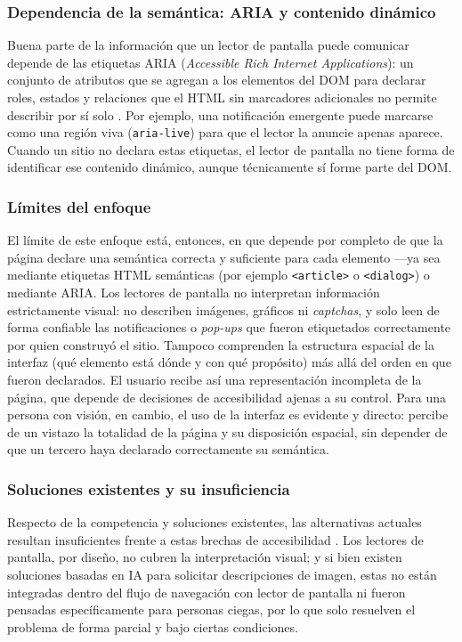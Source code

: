 \subsubsection{Dependencia de la semántica: ARIA y contenido dinámico}

Buena parte de la información que un lector de pantalla puede comunicar depende de las etiquetas ARIA (\textit{Accessible Rich Internet Applications}): un conjunto de atributos que se agregan a los elementos del DOM para declarar roles, estados y relaciones que el HTML sin marcadores adicionales no permite describir por sí solo \cite{mdn2024aria}. Por ejemplo, una notificación emergente puede marcarse como una región viva (\texttt{aria-live}) para que el lector la anuncie apenas aparece. Cuando un sitio no declara estas etiquetas, el lector de pantalla no tiene forma de identificar ese contenido dinámico, aunque técnicamente sí forme parte del DOM.

\subsubsection{Límites del enfoque}

El límite de este enfoque está, entonces, en que depende por completo de que la página declare una semántica correcta y suficiente para cada elemento —ya sea mediante etiquetas HTML semánticas (por ejemplo \texttt{<article>} o \texttt{<dialog>}) o mediante ARIA. Los lectores de pantalla no interpretan información estrictamente visual: no describen imágenes, gráficos ni \textit{captchas}, y solo leen de forma confiable las notificaciones o \textit{pop-ups} que fueron etiquetados correctamente por quien construyó el sitio. Tampoco comprenden la estructura espacial de la interfaz (qué elemento está dónde y con qué propósito) más allá del orden en que fueron declarados. El usuario recibe así una representación incompleta de la página, que depende de decisiones de accesibilidad ajenas a su control. Para una persona con visión, en cambio, el uso de la interfaz es evidente y directo: percibe de un vistazo la totalidad de la página y su disposición espacial, sin depender de que un tercero haya declarado correctamente su semántica.

\subsubsection{Soluciones existentes y su insuficiencia}

Respecto de la competencia y soluciones existentes, las alternativas actuales resultan insuficientes frente a estas brechas de accesibilidad \cite{wcag22}. Los lectores de pantalla, por diseño, no cubren la interpretación visual; y si bien existen soluciones basadas en IA para solicitar descripciones de imagen, estas no están integradas dentro del flujo de navegación con lector de pantalla ni fueron pensadas específicamente para personas ciegas, por lo que solo resuelven el problema de forma parcial y bajo ciertas condiciones.

